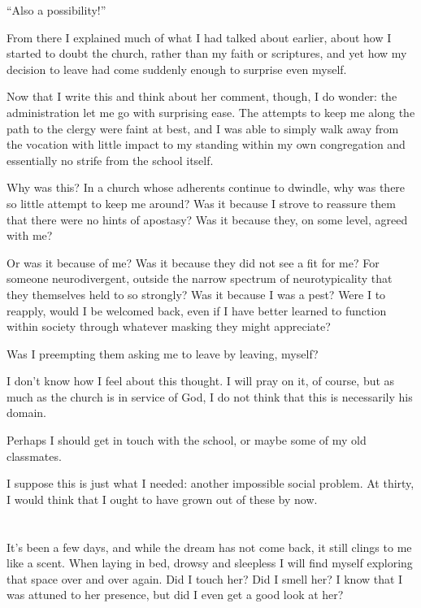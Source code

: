 ``Also a possibility!''

From there I explained much of what I had talked about earlier, about how I started to doubt the church, rather than my faith or scriptures, and yet how my decision to leave had come suddenly enough to surprise even myself.

Now that I write this and think about her comment, though, I do wonder: the administration let me go with surprising ease. The attempts to keep me along the path to the clergy were faint at best, and I was able to simply walk away from the vocation with little impact to my standing within my own congregation and essentially no strife from the school itself.

Why was this? In a church whose adherents continue to dwindle, why was there so little attempt to keep me around? Was it because I strove to reassure them that there were no hints of apostasy? Was it because they, on some level, agreed with me?

Or was it because of me? Was it because they did not see a fit for me? For someone neurodivergent, outside the narrow spectrum of neurotypicality that they themselves held to so strongly? Was it because I was a pest? Were I to reapply, would I be welcomed back, even if I have better learned to function within society through whatever masking they might appreciate?

Was I preempting them asking me to leave by leaving, myself?

I don't know how I feel about this thought. I will pray on it, of course, but as much as the church is in service of God, I do not think that this is necessarily his domain.

Perhaps I should get in touch with the school, or maybe some of my old classmates.

I suppose this is just what I needed: another impossible social problem. At thirty, I would think that I ought to have grown out of these by now.

\section{}

It's been a few days, and while the dream has not come back, it still clings to me like a scent. When laying in bed, drowsy and sleepless I will find myself exploring that space over and over again. Did I touch her? Did I smell her? I know that I was attuned to her presence, but did I even get a good look at her?

